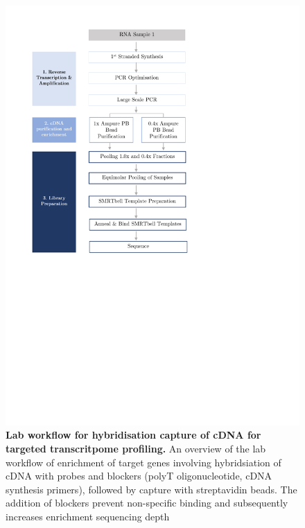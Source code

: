 \begin{figure}[!h]
	\begin{center}
		\includegraphics[page=12,trim={0cm 6cm 0cm 1cm},clip,scale = 0.70]{Figures/ProjectDevelopment_Figures.pdf}
	\end{center}
	\captionsetup{width=0.95\textwidth}
	\caption[Lab workflow for hybridisation capture of cDNA for targeted transcritpome profiling]%
	{\textbf{Lab workflow for hybridisation capture of cDNA for targeted transcritpome profiling.} An overview of the lab workflow of enrichment of target genes involving hybridsiation of cDNA with probes and blockers (polyT oligonucleotide, cDNA synthesis primers), followed by capture with streptavidin beads. The addition of blockers prevent non-specific binding and subsequently increases enrichment sequencing depth}
	\label{fig:isoseq_targetcapture}
\end{figure}

